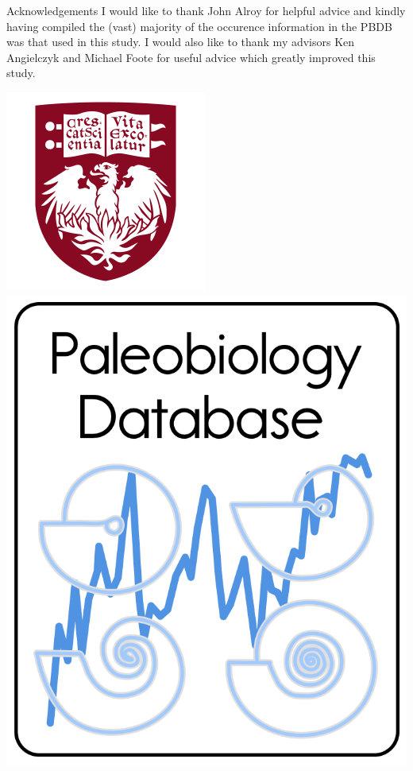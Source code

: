 \documentclass[final]{beamer}\usepackage[]{graphicx}\usepackage[]{color}
\newlength{\onecolwid}
\begin{document}
\begin{frame}[t]
\begin{columns}[t]
\begin{columns}[t,totalwidth = \onecolwid]
\begin{column}{\onecolwid}
        \begin{scriptsize}
          \begin{block}{Acknowledgements}
            I would like to thank John Alroy for helpful advice and kindly having compiled the (vast) majority of the occurence information in the PBDB was that used in this study. I would also like to thank my advisors Ken Angielczyk and Michael Foote for useful advice which greatly improved this study. 
            \begin{center}
              \includegraphics[height = 0.1\textheight]{figure/chicago}
              \includegraphics[height = 0.1\textheight]{figure/pbdb}
            \end{center}
          \end{block}
        \end{scriptsize}


\end{column}
\end{columns}
\end{columns}
\end{frame}
\end{document}
